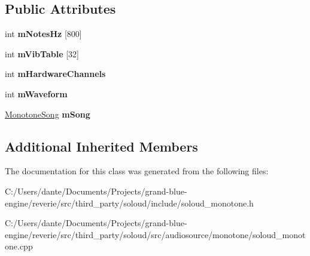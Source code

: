 \subsection*{Public Attributes}
\begin{DoxyCompactItemize}
\item 
\mbox{\label{class_so_loud_1_1_monotone_ae9457bde8afdc530f84ac285503b7973}} 
int {\bfseries m\+Notes\+Hz} \mbox{[}800\mbox{]}
\item 
\mbox{\label{class_so_loud_1_1_monotone_ab4a409741b4e71777b910e3808ff3d00}} 
int {\bfseries m\+Vib\+Table} \mbox{[}32\mbox{]}
\item 
\mbox{\label{class_so_loud_1_1_monotone_a88755b618ac5fb430bf44ae0da37f9bf}} 
int {\bfseries m\+Hardware\+Channels}
\item 
\mbox{\label{class_so_loud_1_1_monotone_ac9a718582a6d8ee99100c30e8299d881}} 
int {\bfseries m\+Waveform}
\item 
\mbox{\label{class_so_loud_1_1_monotone_adceb8944d5607a506b7fd57a9a40c5e7}} 
\mbox{\hyperlink{struct_so_loud_1_1_monotone_song}{Monotone\+Song}} {\bfseries m\+Song}
\end{DoxyCompactItemize}
\subsection*{Additional Inherited Members}


The documentation for this class was generated from the following files\+:\begin{DoxyCompactItemize}
\item 
C\+:/\+Users/dante/\+Documents/\+Projects/grand-\/blue-\/engine/reverie/src/third\+\_\+party/soloud/include/soloud\+\_\+monotone.\+h\item 
C\+:/\+Users/dante/\+Documents/\+Projects/grand-\/blue-\/engine/reverie/src/third\+\_\+party/soloud/src/audiosource/monotone/soloud\+\_\+monotone.\+cpp\end{DoxyCompactItemize}
